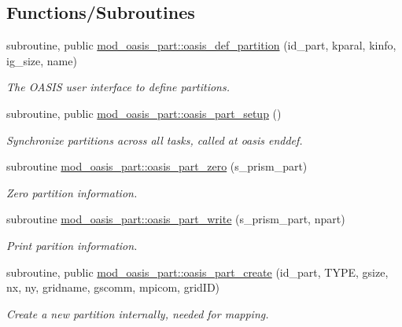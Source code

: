 \subsection*{Functions/\+Subroutines}
\begin{DoxyCompactItemize}
\item 
subroutine, public \hyperlink{namespacemod__oasis__part_af070605328f2b705735d7fbf8b838ff4}{mod\+\_\+oasis\+\_\+part\+::oasis\+\_\+def\+\_\+partition} (id\+\_\+part, kparal, kinfo, ig\+\_\+size, name)
\begin{DoxyCompactList}\small\item\em The O\+A\+S\+IS user interface to define partitions. \end{DoxyCompactList}\item 
subroutine, public \hyperlink{namespacemod__oasis__part_a80f66cc0ce5857aa53d070861f05b521}{mod\+\_\+oasis\+\_\+part\+::oasis\+\_\+part\+\_\+setup} ()
\begin{DoxyCompactList}\small\item\em Synchronize partitions across all tasks, called at oasis enddef. \end{DoxyCompactList}\item 
subroutine \hyperlink{namespacemod__oasis__part_a17c747bc29d25b558df42524bd63ac90}{mod\+\_\+oasis\+\_\+part\+::oasis\+\_\+part\+\_\+zero} (s\+\_\+prism\+\_\+part)
\begin{DoxyCompactList}\small\item\em Zero partition information. \end{DoxyCompactList}\item 
subroutine \hyperlink{namespacemod__oasis__part_a12edb4b0248a3f562fe5f6e16eede06a}{mod\+\_\+oasis\+\_\+part\+::oasis\+\_\+part\+\_\+write} (s\+\_\+prism\+\_\+part, npart)
\begin{DoxyCompactList}\small\item\em Print parition information. \end{DoxyCompactList}\item 
subroutine, public \hyperlink{namespacemod__oasis__part_aacc20c24f42edbef4ec2610bf98aadfc}{mod\+\_\+oasis\+\_\+part\+::oasis\+\_\+part\+\_\+create} (id\+\_\+part, T\+Y\+PE, gsize, nx, ny, gridname, gscomm, mpicom, grid\+ID)
\begin{DoxyCompactList}\small\item\em Create a new partition internally, needed for mapping. \end{DoxyCompactList}\end{DoxyCompactItemize}
